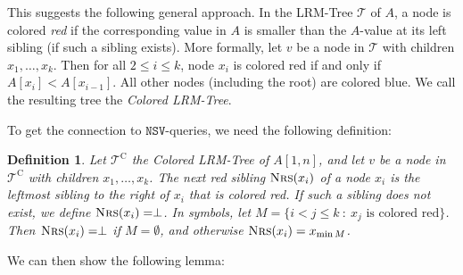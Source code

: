 \documentclass[11pt,onecolumn,final]{article} \usepackage{a4}
\newcommand{\nsv}[0]{\mathtt{NSV}}
\newcommand{\nrs}{\ensuremath{\textsc{Nrs}}} \newcommand{\laq}{\ensuremath{\textsc{Laq}}}
\theoremstyle{plain}
\newtheorem{definition}{Definition}
\theoremstyle{remark}
\begin{document}
This suggests the following general approach. In the LRM-Tree $\mathcal{T}$ of $A$, a node is colored \emph{red} if the corresponding value in $A$ is smaller than the $A$-value at its left sibling (if such a sibling exists). More formally, let $v$ be a node in $\mathcal{T}$ with children $x_1,\dots,x_k$. Then for all $2 \le i \le k$, node $x_i$ is colored red if and only if $A[x_i] < A[x_{i-1}]$. All other nodes (including the root) are colored blue. We call the resulting tree the \emph{Colored LRM-Tree}.

To get the connection to $\nsv$-queries, we need the following definition:
\begin{definition}
  \label{def:nrs}
  Let $\mathcal{T}^\textrm{C}$ the Colored LRM-Tree of $A[1,n]$, and let $v$ be a node in $\mathcal{T}^\textrm{C}$ with children $x_1,\dots,x_k$. The \emph{next red sibling} $\nrs(x_i)$ of a node $x_i$ is the leftmost sibling to the right of $x_i$ that is colored red. If such a sibling does not exist, we define $\nrs(x_i)=\perp$. In symbols, let $M = \{i<j\le k~:~x_j\text{~is colored red}\}$. Then $\nrs(x_i)=\perp$ if $M=\emptyset$, and otherwise $\nrs(x_i)=x_{\min M}$.
\end{definition}

We can then show the following lemma:
\end{document}
